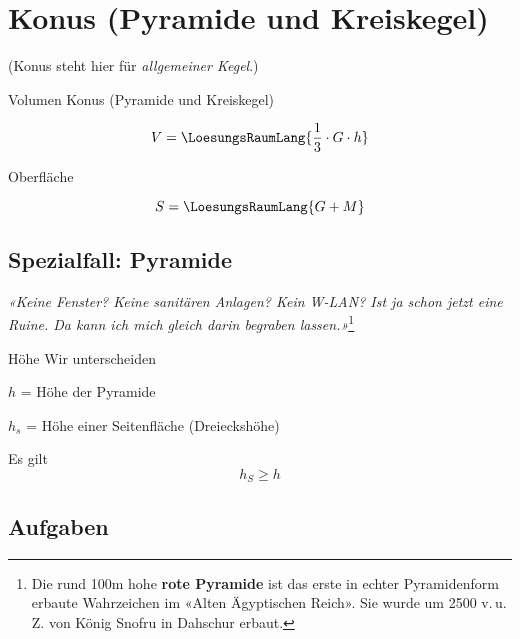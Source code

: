 \section{Konus (Pyramide und Kreiskegel)}

(Konus steht hier für \textit{allgemeiner Kegel}.)



\begin{gesetz}{Volumen Konus (Pyramide und Kreiskegel)}{}
  
  $$V = \LoesungsRaumLang{\frac13\cdot{}G\cdot{}h}$$
\end{gesetz}

\begin{gesetz}{Oberfläche}{}

  $$S = \LoesungsRaumLang{G + M}$$
  \end{gesetz}
\newpage

\subsection{Spezialfall: Pyramide}


\begin{center}
{\textit{«Keine Fenster? Keine sanitären Anlagen? Kein W-LAN? Ist ja schon
jetzt eine Ruine. Da kann ich mich gleich darin begraben
lassen.»}}\footnote{Die rund 100m hohe \textbf{rote Pyramide} ist das
  erste in echter Pyramidenform erbaute Wahrzeichen im «Alten
  Ägyptischen Reich». Sie wurde um 2500 v.\,u.\,Z. von König Snofru in
Dahschur erbaut.}
\end{center}


\begin{bemerkung}{Höhe}{}
  Wir unterscheiden

  $h$ = Höhe der Pyramide

  $h_s$ = Höhe einer Seitenfläche (Dreieckshöhe)
\end{bemerkung}
\begin{gesetz}{}{}
  Es gilt
  $$h_S \ge h$$
  \end{gesetz}
\newpage
\subsection*{Aufgaben}
\newpage

